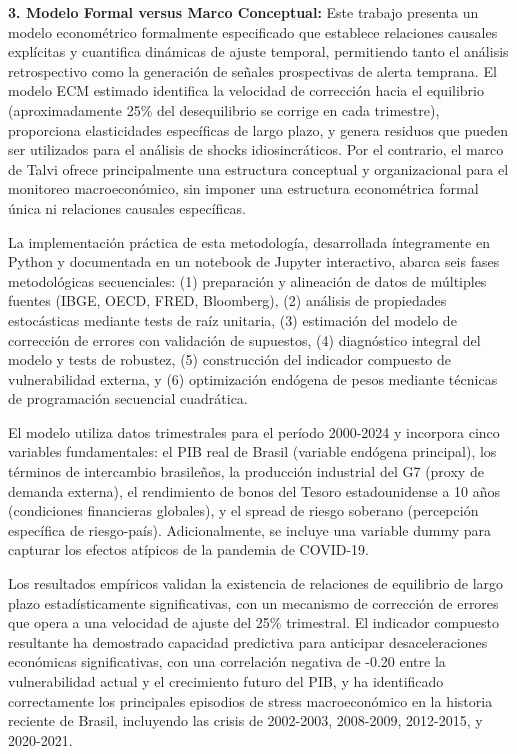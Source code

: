 \documentclass[3p,11pt]{elsarticle}
\begin{document}
\textbf{3. Modelo Formal versus Marco Conceptual:} Este trabajo presenta un modelo econométrico formalmente especificado que establece relaciones causales explícitas y cuantifica dinámicas de ajuste temporal, permitiendo tanto el análisis retrospectivo como la generación de señales prospectivas de alerta temprana. El modelo ECM estimado identifica la velocidad de corrección hacia el equilibrio (aproximadamente 25\% del desequilibrio se corrige en cada trimestre), proporciona elasticidades específicas de largo plazo, y genera residuos que pueden ser utilizados para el análisis de shocks idiosincráticos. Por el contrario, el marco de Talvi ofrece principalmente una estructura conceptual y organizacional para el monitoreo macroeconómico, sin imponer una estructura econométrica formal única ni relaciones causales específicas.

La implementación práctica de esta metodología, desarrollada íntegramente en Python y documentada en un notebook de Jupyter interactivo, abarca seis fases metodológicas secuenciales: (1) preparación y alineación de datos de múltiples fuentes (IBGE, OECD, FRED, Bloomberg), (2) análisis de propiedades estocásticas mediante tests de raíz unitaria, (3) estimación del modelo de corrección de errores con validación de supuestos, (4) diagnóstico integral del modelo y tests de robustez, (5) construcción del indicador compuesto de vulnerabilidad externa, y (6) optimización endógena de pesos mediante técnicas de programación secuencial cuadrática.

El modelo utiliza datos trimestrales para el período 2000-2024 y incorpora cinco variables fundamentales: el PIB real de Brasil (variable endógena principal), los términos de intercambio brasileños, la producción industrial del G7 (proxy de demanda externa), el rendimiento de bonos del Tesoro estadounidense a 10 años (condiciones financieras globales), y el spread de riesgo soberano (percepción específica de riesgo-país). Adicionalmente, se incluye una variable dummy para capturar los efectos atípicos de la pandemia de COVID-19.

Los resultados empíricos validan la existencia de relaciones de equilibrio de largo plazo estadísticamente significativas, con un mecanismo de corrección de errores que opera a una velocidad de ajuste del 25\% trimestral. El indicador compuesto resultante ha demostrado capacidad predictiva para anticipar desaceleraciones económicas significativas, con una correlación negativa de -0.20 entre la vulnerabilidad actual y el crecimiento futuro del PIB, y ha identificado correctamente los principales episodios de stress macroeconómico en la historia reciente de Brasil, incluyendo las crisis de 2002-2003, 2008-2009, 2012-2015, y 2020-2021.
\end{document}

